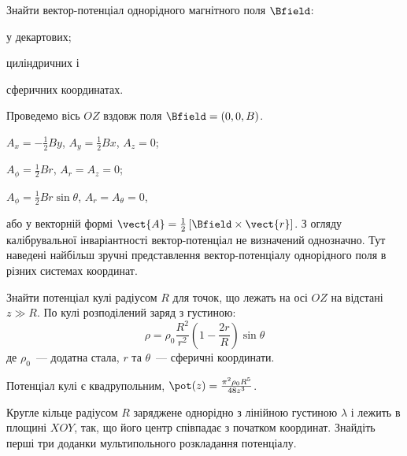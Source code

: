 
\begin{problem}
Знайти вектор-потенціал однорідного магнітного поля $\Bfield$:
\begin{enumerate*}[label=\alph*)]
	\item у декартових;
	\item циліндричних і
	\item сферичних координатах.
\end{enumerate*}
\begin{solution}
	Проведемо вісь $OZ$ вздовж поля $\Bfield = (0, 0, B)$.
	\begin{enumerate*}[label=\alph*)]
		\item $A_x = -\frac12 By$, $A_y = \frac12 Bx$, $A_z = 0$;
		\item $A_{\phi} = \frac12 Br$, $A_r = A_z = 0$;
		\item $A_{\phi} = \frac12 Br\sin\theta$, $A_r = A_{\theta} = 0$,
	\end{enumerate*}
або у векторній формі 	$\vect{A} = \frac12 \left[ \Bfield\times \vect{r} \right] $.
	З огляду калібрувальної інваріантності вектор-потенціал не визначений однозначно. Тут наведені найбільш зручні представлення вектор-потенціалу однорідного поля в різних системах координат.
\end{solution}
\end{problem}

\begin{problem}%
Знайти потенціал кулі радіусом $R$ для точок, що лежать на осі $OZ$ на відстані $z \gg R$. По кулі розподілений заряд з густиною:
\[
	\rho = \rho_0 \frac{R^2}{r^2}\left( 1 - \frac{2r}{R}\right)\sin\theta
\]
де $\rho_0$~--- додатна стала, $r$ та $\theta$~--- сферичні координати.
\begin{solution}
	Потенціал кулі є квадрупольним, $\pot(z) = \frac{\pi^2\rho_0 R^5}{48z^3}$.
\end{solution}
\end{problem}

\begin{problem}%
Кругле кільце радіусом $R$ заряджене однорідно з лінійною густиною $\lambda$ і лежить в площині $XOY$, так, що його центр співпадає з початком координат. Знайдіть перші три доданки мультипольного розкладання потенціалу.
\end{problem}

